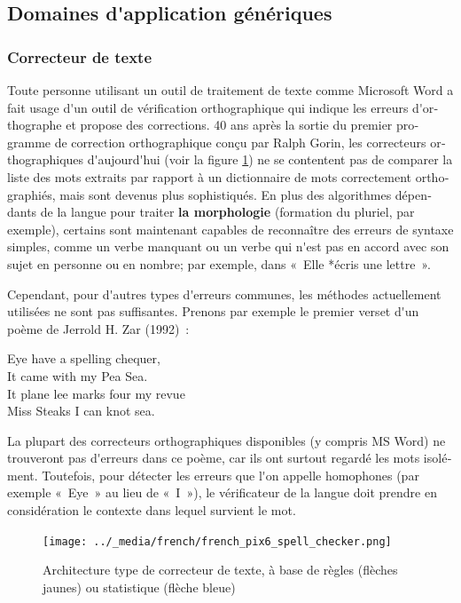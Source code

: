 \begin{french}
\begin{multicols}{2}
\subsection{Domaines d{\mbox '}application génériques}

\subsubsection{Correcteur de texte}
Toute personne utilisant un outil de traitement de texte comme
Microsoft Word a fait usage d{\mbox '}un outil de vérification orthographique
qui indique les erreurs d{\mbox '}orthographe et propose des corrections.  40
ans après la sortie du premier programme de correction orthographique
conçu par Ralph Gorin, les correcteurs orthographiques d{\mbox '}aujourd{\mbox '}hui
(voir la figure \ref{fig:spellchecker}) ne se contentent pas de
comparer la liste des mots extraits par rapport à un dictionnaire de
mots correctement orthographiés, mais sont devenus plus
sophistiqués. En plus des algorithmes dépendants de la langue pour
traiter {\bf la morphologie} (formation du pluriel, par exemple),
certains sont maintenant capables de reconnaître des erreurs de
syntaxe simples, comme un verbe manquant ou un verbe qui n{\mbox '}est pas en
accord avec son sujet en personne ou en nombre; par exemple, dans
«~Elle *écris une lettre~».

Cependant, pour d{\mbox '}autres types d{\mbox '}erreurs communes, les
méthodes actuellement utilisées ne sont pas suffisantes. Prenons par
exemple le premier verset d{\mbox '}un poème de Jerrold H. Zar
(1992)~:\\
\begin{it}
\begin{center}
Eye have a spelling chequer,\\
It came with my Pea Sea.\\
It plane lee marks four my revue\\
Miss Steaks I can knot sea.\\
\end{center}
\end{it}
La plupart des correcteurs orthographiques disponibles (y compris MS
Word) ne trouveront pas d{\mbox '}erreurs dans ce poème, car ils ont surtout
regardé les mots isolément. Toutefois, pour détecter les erreurs que
l{\mbox '}on appelle homophones (par exemple «~Eye~» au lieu de «~I~»), le
vérificateur de la langue doit prendre en considération le contexte
dans lequel survient le mot.

\begin{figure}[!ht]
\begin{center}
  \texttt{[image: ../\_media/french/french\_pix6\_spell\_checker.png]}
\caption{Architecture type de correcteur de texte, à base de règles (flèches jaunes) ou statistique (flèche bleue)}
\label{fig:spellchecker}
\end{center}
\end{figure}


\end{multicols}
\end{french}
